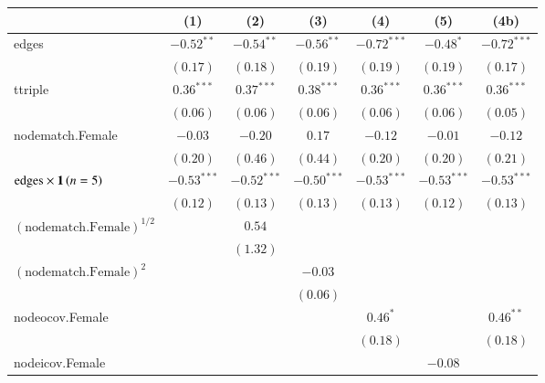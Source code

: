
\begin{table}[tb]
\centering
\small
\begin{tabular}{l c c c c c c }
\toprule
 & (1) & (2) & (3) & (4) & (5) & (4b) \\
\midrule
edges                     & $-0.52^{**}$  & $-0.54^{**}$  & $-0.56^{**}$  & $-0.72^{***}$ & $-0.48^{*}$   & $-0.72^{***}$ \\
                          & $(0.17)$      & $(0.18)$      & $(0.19)$      & $(0.19)$      & $(0.19)$      & $(0.17)$      \\
ttriple                   & $0.36^{***}$  & $0.37^{***}$  & $0.38^{***}$  & $0.36^{***}$  & $0.36^{***}$  & $0.36^{***}$  \\
                          & $(0.06)$      & $(0.06)$      & $(0.06)$      & $(0.06)$      & $(0.06)$      & $(0.05)$      \\
nodematch.Female          & $-0.03$       & $-0.20$       & $0.17$        & $-0.12$       & $-0.01$       & $-0.12$       \\
                          & $(0.20)$      & $(0.46)$      & $(0.44)$      & $(0.20)$      & $(0.20)$      & $(0.21)$      \\
$\text{edges} \times {\boldsymbol{1}\left( n = 5 \right)}$       & $-0.53^{***}$ & $-0.52^{***}$ & $-0.50^{***}$ & $-0.53^{***}$ & $-0.53^{***}$ & $-0.53^{***}$ \\
                          & $(0.12)$      & $(0.13)$      & $(0.13)$      & $(0.13)$      & $(0.12)$      & $(0.13)$      \\
$(\text{nodematch.Female})^{1/2}$ &               & $0.54$        &               &               &               &               \\
                          &               & $(1.32)$      &               &               &               &               \\
$(\text{nodematch.Female})^2$   &               &               & $-0.03$       &               &               &               \\
                          &               &               & $(0.06)$      &               &               &               \\
nodeocov.Female           &               &               &               & $0.46^{*}$    &               & $0.46^{**}$   \\
                          &               &               &               & $(0.18)$      &               & $(0.18)$      \\
nodeicov.Female           &               &               &               &               & $-0.08$       &               \\

\end{tabular}
\end{table}
